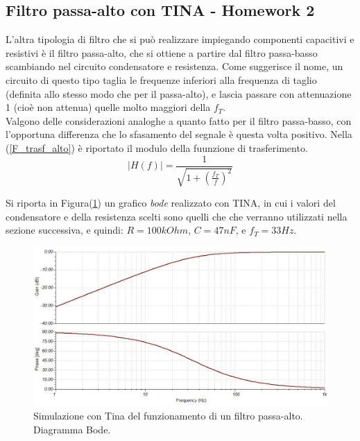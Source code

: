 \documentclass[journal, a4paper]{IEEEtran}
\begin{document}
\subsection{Filtro passa-alto con TINA - Homework 2}
L'altra tipologia di filtro che si può realizzare impiegando componenti capacitivi e resistivi è il filtro passa-alto, che si ottiene a partire dal filtro passa-basso scambiando nel circuito condensatore e resistenza. Come suggerisce il nome, un circuito di questo tipo taglia le frequenze inferiori alla frequenza di taglio (definita allo stesso modo che per il passa-alto), e lascia passare con attenuazione 1 (cioè non attenua) quelle molto maggiori della $f_T$.\\
Valgono delle considerazioni analoghe a quanto fatto per il filtro passa-basso, con l'opportuna differenza che lo sfasamento del segnale è questa volta positivo. Nella (\ref{F_trasf_alto}) è riportato il modulo della fuunzione di trasferimento.\\

\begin{equation}\label{F_trasf_alto}
\rvert H(f) \lvert = \frac{1}{\sqrt{1+(\frac{f_T}{f})^2}}
\end{equation}

Si riporta in Figura(\ref{fig:passa_alto}) un grafico \textit{bode} realizzato con TINA, in cui i valori del condensatore e della resistenza scelti sono quelli che che verranno utilizzati nella sezione successiva, e quindi: $R = 100 \si{kOhm}$, $C = 47 \si{nF}$, e $f_T = 33 \si{Hz}$.\\

\begin{figure}
\centering
\includegraphics[width=0.9\linewidth]{./passa_alto}
\caption{Simulazione con Tina del funzionamento di un filtro passa-alto. Diagramma Bode.}
\label{fig:passa_alto}
\end{figure}
\end{document}
